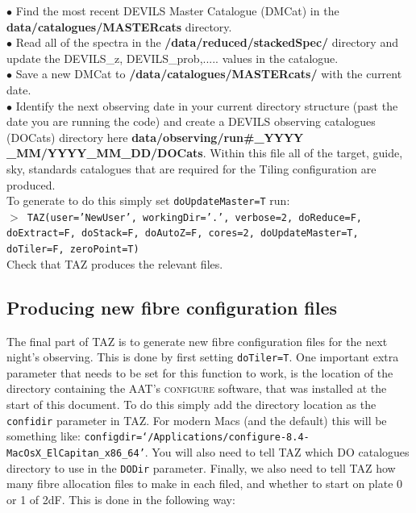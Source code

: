 \documentclass[12pt]{article}
\begin{document}
$\bullet$ Find the most recent DEVILS Master Catalogue (DMCat) in the \textbf{data/catalogues/MASTERcats} directory.\\


$\bullet$ Read all of the spectra in the \textbf{/data/reduced/stackedSpec/} directory and update the DEVILS\_z,  DEVILS\_prob,..... values in the catalogue.\\

$\bullet$ Save a new DMCat to \textbf{/data/catalogues/MASTERcats/} with the current date. \\

$\bullet$ Identify the next observing date in your current directory structure (past the date you are running the code) and create a DEVILS observing catalogues (DOCats) directory here \textbf{data/observing/run\#\_YYYY \_MM/YYYY\_MM\_DD/DOCats}. Within this file all of the target, guide, sky, standards catalogues that are required for the Tiling configuration are produced.\\

To generate to do this simply set \texttt{doUpdateMaster=T} run:\\

  \hspace{10mm} \texttt{$>$ TAZ(user='NewUser', workingDir='.', verbose=2, doReduce=F, doExtract=F, doStack=F, doAutoZ=F,  cores=2, doUpdateMaster=T, doTiler=F, zeroPoint=T)}\\  
  
  Check that TAZ produces the relevant files. 


 \subsection{Producing new fibre configuration files}
 
 The final part of TAZ is to generate new fibre configuration files for the next night's observing. This is done by first setting \texttt{doTiler=T}. One important extra parameter that needs to be set for this function to work, is the location of the directory containing the AAT's \textsc{configure} software, that was installed at the start of this document. To do this simply add the directory location as the \texttt{confidir} parameter in TAZ. For modern Macs (and the default) this will be something like: \texttt{configdir=`/Applications/configure-8.4-MacOsX\_ElCapitan\_x86\_64'}. You will also need to tell TAZ which DO catalogues directory to use in the \texttt{DODir} parameter. Finally, we also need to tell TAZ how many fibre allocation files to make in each filed, and whether to start on plate 0 or 1 of 2dF. This is done in the following way: \\
 
\end{document}
